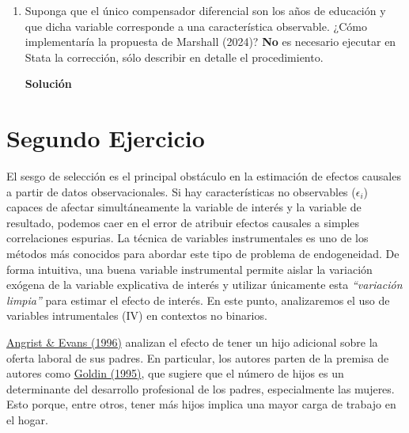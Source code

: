 \documentclass[a4paper, answers, addpoints, 11pt]{exam}
\newenvironment{solucion}{%
  \begin{mdframed}[
    backgroundcolor=blue!5,    %
    linecolor=blue!50,          %
    linewidth=2pt,              %
    leftmargin=10pt,            %
    rightmargin=8pt,           %
    topline=true,              %
    bottomline=true,            %
    roundcorner=10pt,           %
    innerleftmargin=10pt,       %
    innerrightmargin=10pt,      %
    innerbottommargin=10pt,     %
    innertopmargin=10pt         %
  ]%
  \begin{tcolorbox}[colframe=blue!50!black, colback=blue!50, coltitle=white, sharp corners=all, boxrule=1mm, width=\textwidth, halign=left, valign=center, top=0mm, bottom=0mm, left=0mm, right=0mm] \textbf{Solución} \end{tcolorbox} }{\end{mdframed}}
\begin{document}
\bigskip

\begin{enumerate}[resume]
\item Suponga que el único compensador diferencial son los años de educación y que dicha variable corresponde a una característica observable. ¿Cómo implementaría la propuesta de Marshall (2024)? \textbf{No} es necesario ejecutar en Stata la corrección, sólo describir en detalle el procedimiento.
    

\begin{solucion}
\end{solucion}
\end{enumerate}

\newpage
\section*{Segundo Ejercicio}
El sesgo de selección es el principal obstáculo en la estimación de efectos causales a partir de datos observacionales. Si hay características no observables ($\epsilon_i$) capaces de afectar simultáneamente la variable de interés y la variable de resultado, podemos caer en el error de atribuir efectos causales a simples correlaciones espurias. La técnica de variables instrumentales es uno de los métodos más conocidos para abordar este tipo de problema de endogeneidad. De forma intuitiva, una buena variable instrumental permite aislar la variación exógena de la variable explicativa de interés y utilizar únicamente esta \textit{``variación limpia''} para estimar el efecto de interés. En este punto, analizaremos el uso de variables intrumentales (IV) en contextos no binarios.

\bigbreak
\href{https://www.nber.org/system/files/working_papers/w5778/w5778.pdf}{Angrist \& Evans (1996)} analizan el efecto de tener un hijo adicional sobre la oferta laboral de sus padres. En particular, los autores parten de la premisa de autores como \href{https://www.nber.org/system/files/working_papers/w5188/w5188.pdf}{Goldin (1995)}, que sugiere que el número de hijos es un determinante del desarrollo profesional de los padres, especialmente las mujeres. Esto porque, entre otros, tener más hijos implica una mayor carga de trabajo en el hogar. 
\end{document}
